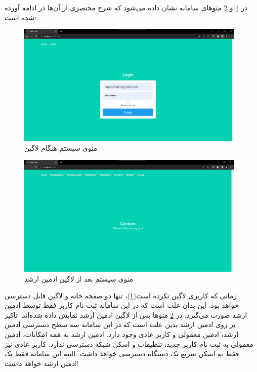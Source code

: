 در \cref{fig.12} و \cref{fig.13} منو‌های سامانه نشان داده می‌شود که شرح مختصری از آن‌ها در ادامه آورده شده است:


\begin{figure}[!h]
    \centering\includegraphics[scale=.38]{./nav-logout}
    \caption{منوی سیستم هنگام لاگین}\label{fig.12}
\end{figure}

\begin{figure}[!h]
    \centering\includegraphics[scale=.38]{./nav-login}
    \caption{منوی سیستم بعد از لاگین ادمین ارشد}\label{fig.13}
\end{figure}
        
زمانی که کاربری لاگین نکرده است(\cref{fig.12})، تنها دو صفحه خانه و لاگین قابل دسترسی خواهد بود. این بدان علت است که در این سامانه ثبت نام کاربر فقط توسط ادمین ارشد صورت می‌گیرد. در \cref{fig.13} منوها پس از لاگین ادمین ارشد نمایش داده شده‌اند. تاکیر بر روی ادمین ارشد بدین علت است که در این سامانه سه سطح دسترسی ادمین ارشد، ادمین معمولی و کاربر عادی وجود دارد. ادمین ارشد به همه امکانات، ادمین معمولی به ثبت نام کاربر جدید، تنظیمات و اسکن شبکه دسترسی ندارد. کاربر عادی نیز فقط به اسکن سریع یک دستگاه دسترسی خواهد داشت. البته این سامانه فقط یک ادمین ارشد خواهد داشت!

